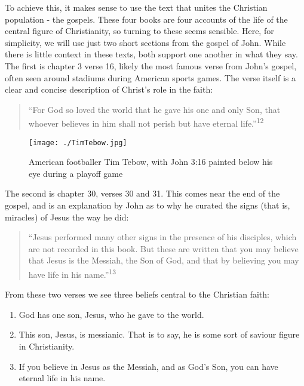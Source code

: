 \documentclass[]{article}
\providecommand{\tightlist}{%
  \setlength{\itemsep}{0pt}\setlength{\parskip}{0pt}}
\begin{document}
To achieve this, it makes sense to use the text that unites the
Christian population - the gospels. These four books are four accounts
of the life of the central figure of Christianity, so turning to these
seems sensible. Here, for simplicity, we will use just two short
sections from the gospel of John. While there is little context in these
texts, both support one another in what they say. The first is chapter 3
verse 16, likely the most famous verse from John's gospel, often seen
around stadiums during American sports games. The verse itself is a
clear and concise description of Christ's role in the faith:

\begin{quote}
``For God so loved the world that he gave his one and only Son, that
whoever believes in him shall not perish but have eternal
life.''\textsuperscript{12}
\end{quote}

\begin{figure}
\centering
\texttt{[image: ./TimTebow.jpg]}
\caption{American footballer Tim Tebow, with John 3:16 painted below his
eye during a playoff game}
\end{figure}

The second is chapter 30, verses 30 and 31. This comes near the end of
the gospel, and is an explanation by John as to why he curated the signs
(that is, miracles) of Jesus the way he did:

\begin{quote}
``Jesus performed many other signs in the presence of his disciples,
which are not recorded in this book. But these are written that you may
believe that Jesus is the Messiah, the Son of God, and that by believing
you may have life in his name.''\textsuperscript{13}
\end{quote}

From these two verses we see three beliefs central to the Christian
faith:

\begin{enumerate}
\def\labelenumi{\arabic{enumi}.}
\tightlist
\item
  God has one son, Jesus, who he gave to the world.
\item
  This son, Jesus, is messianic. That is to say, he is some sort of
  saviour figure in Christianity.
\item
  If you believe in Jesus as the Messiah, and as God's Son, you can have
  eternal life in his name.
\end{enumerate}
\end{document}
